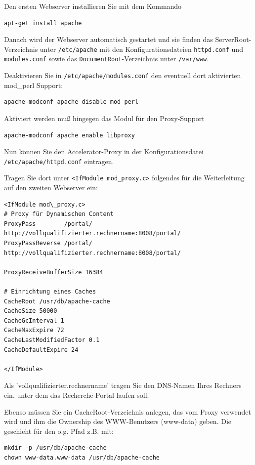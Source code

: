 \documentclass[11pt, twoside, a4paper, BCOR8mm, DIV12, bibtotoc,idxtotoc]{scrbook}
\begin{document}
Den ersten Webserver installieren Sie mit dem Kommando

\begin{verbatim}
apt-get install apache
\end{verbatim}

Danach wird der Webserver automatisch gestartet und sie finden das
ServerRoot-Verzeichnis unter \texttt{/etc/apache} mit den Konfigurationsdateien
\texttt{httpd.conf} und \texttt{modules.conf} sowie das \texttt{DocumentRoot}-Verzeichnis unter
\texttt{/var/www}.

Deaktivieren Sie in \texttt{/etc/apache/modules.conf} den eventuell
dort aktivierten mod\_perl Support:

\begin{verbatim}
apache-modconf apache disable mod_perl
\end{verbatim}

Aktiviert werden muß hingegen das Modul für den Proxy-Support

\begin{verbatim}
apache-modconf apache enable libproxy
\end{verbatim}


Nun können Sie den Accelerator-Proxy in der Konfigurationsdatei
\texttt{/etc/apache/httpd.conf} eintragen.

Tragen Sie dort unter \texttt{<IfModule mod\_proxy.c>} folgendes für die
Weiterleitung auf den zweiten Webserver ein:

\begin{verbatim}
<IfModule mod\_proxy.c>
# Proxy für Dynamischen Content
ProxyPass        /portal/ http://vollqualifizierter.rechnername:8008/portal/
ProxyPassReverse /portal/ http://vollqualifizierter.rechnername:8008/portal/

ProxyReceiveBufferSize 16384

# Einrichtung eines Caches
CacheRoot /usr/db/apache-cache
CacheSize 50000
CacheGcInterval 1
CacheMaxExpire 72
CacheLastModifiedFactor 0.1
CacheDefaultExpire 24

</IfModule>
\end{verbatim}

Als 'vollqualifizierter.rechnername' tragen Sie den DNS-Namen Ihres
Rechners ein, unter dem das Recherche-Portal laufen soll.

Ebenso müssen Sie ein CacheRoot-Verzeichnis anlegen, das vom Proxy
verwendet wird und ihm die Ownership des WWW-Benutzers (www-data)
geben. Die geschieht für den o.g. Pfad z.B. mit:

\begin{verbatim}
mkdir -p /usr/db/apache-cache
chown www-data.www-data /usr/db/apache-cache
\end{verbatim}
\end{document}
